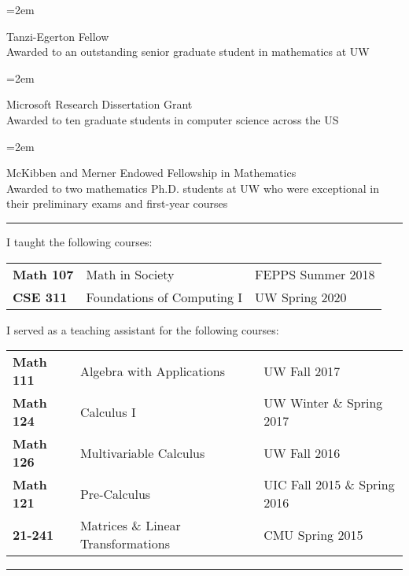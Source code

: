 \documentclass{scrartcl}
\newcommand{\MarginText}[1]{\marginpar{\raggedleft\itshape\small#1}}
\newcommand{\Description}[1]{\hangindent=2em\hangafter=0\noindent\raggedright\footnotesize{#1}\par\normalsize\vspace{1em}}
\begin{document}
\begin{cv}{{}}
\Description{\MarginText{2020}\normalsize{Tanzi-Egerton Fellow}\\
\footnotesize{Awarded to an outstanding senior graduate student in mathematics at UW}}

\Description{\MarginText{2020}\normalsize{Microsoft Research Dissertation Grant}\\
\footnotesize{Awarded to ten graduate students in computer science across the US}}

\Description{\MarginText{2017-2019}\normalsize{McKibben and Merner Endowed Fellowship in Mathematics}\\
\footnotesize{Awarded to two mathematics Ph.D. students at UW who were exceptional in their preliminary exams and first-year courses}}

{\color{Purple}\noindent\rule{12cm}{0.4pt}}

\vspace{1em} 

\vspace{1em}


I taught the following courses:
\begin{center}
	\begin{tabular}{ l l l }
	  \textbf{Math 107}& Math in Society & \footnotesize{FEPPS Summer 2018} \\ 
	  \textbf{CSE 311}&	 Foundations of Computing I & \footnotesize{UW Spring 2020}	
	\end{tabular}
\end{center}

I served as a teaching assistant for the following courses:
\begin{center}
	\begin{tabular}{ l l l }
	  \textbf{Math 111}& Algebra with Applications & \footnotesize{UW Fall 2017} \\ 
	  \textbf{Math 124}&	 Calculus I & \footnotesize{UW Winter  \& Spring 2017}  \\  
	 \textbf{Math 126} &    Multivariable Calculus   & \footnotesize{UW Fall 2016}    \\
	\textbf{Math 121}	& Pre-Calculus	& \footnotesize{UIC Fall 2015 \& Spring 2016}\\	
	\textbf{21-241}	&	Matrices \& Linear Transformations & \footnotesize{CMU Spring 2015 }
	\end{tabular}
\end{center}

{\color{Purple}\noindent\rule{12cm}{0.4pt}}


\end{cv}
\end{document}

